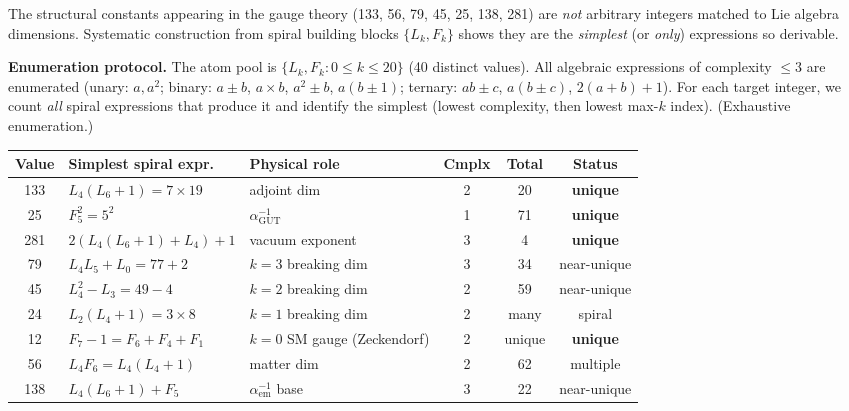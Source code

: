 \documentclass[12pt,a4paper]{article}
\begin{document}
The structural constants appearing in the gauge theory (133, 56, 79, 45, 25, 138, 281) are \emph{not} arbitrary integers matched to Lie algebra dimensions. Systematic construction from spiral building blocks $\{L_k, F_k\}$ shows they are the \emph{simplest} (or \emph{only}) expressions so derivable.

\textbf{Enumeration protocol.} The atom pool is $\{L_k, F_k : 0 \leq k \leq 20\}$ (40 distinct values). All algebraic expressions of complexity $\leq 3$ are enumerated (unary: $a, a^2$; binary: $a \pm b$, $a \times b$, $a^2 \pm b$, $a(b\pm1)$; ternary: $ab \pm c$, $a(b \pm c)$, $2(a+b)+1$). For each target integer, we count \emph{all} spiral expressions that produce it and identify the simplest (lowest complexity, then lowest max-$k$ index). (Exhaustive enumeration.)

\begin{center}
\begin{tabular}{|c|l|l|c|c|c|}
\hline
\textbf{Value} & \textbf{Simplest spiral expr.} & \textbf{Physical role} & \textbf{Cmplx} & \textbf{Total} & \textbf{Status} \\
\hline
133 & $L_4(L_6{+}1) = 7 \times 19$ & adjoint dim & 2 & 20 & \textbf{unique} \\
25  & $F_5^2 = 5^2$ & $\alpha_{\mathrm{GUT}}^{-1}$ & 1 & 71 & \textbf{unique} \\
281 & $2(L_4(L_6{+}1){+}L_4)+1$ & vacuum exponent & 3 & 4 & \textbf{unique} \\
79  & $L_4 L_5 + L_0 = 77{+}2$ & $k{=}3$ breaking dim & 3 & 34 & near-unique \\
45  & $L_4^2 - L_3 = 49{-}4$ & $k{=}2$ breaking dim & 2 & 59 & near-unique \\
24  & $L_2(L_4{+}1) = 3 \times 8$ & $k{=}1$ breaking dim & 2 & many & spiral \\
12  & $F_7 - 1 = F_6 {+} F_4 {+} F_1$ & $k{=}0$ SM gauge (Zeckendorf) & 2 & unique & \textbf{unique} \\
56  & $L_4 F_6 = L_4(L_4{+}1)$ & matter dim & 2 & 62 & multiple \\
138 & $L_4(L_6{+}1) + F_5$ & $\alpha_{\mathrm{em}}^{-1}$ base & 3 & 22 & near-unique \\
\hline
\end{tabular}
\end{center}
\end{document}

